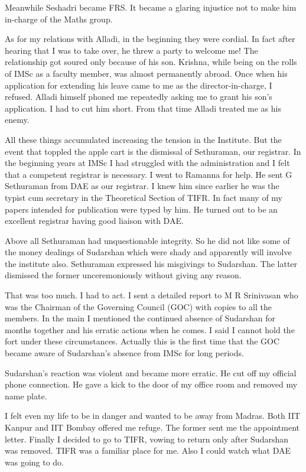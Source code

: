 Meanwhile Seshadri became FRS. It became a glaring injustice not to make 
him in-charge of the Maths group.

As for my relations with Alladi, in the beginning they were cordial. 
In fact after hearing that I was to take over, he threw a party to 
welcome me! The relationship got soured only because of his son. 
Krishna, while being on the rolls of IMSc as a faculty member, was 
almost permanently abroad. Once when his application for extending his 
leave came to me as the director-in-charge, I refused. Alladi himself 
phoned me repeatedly asking me to grant his son's application. I had to 
cut him short. From that time Alladi treated me as his enemy.
 
All these things accumulated increasing the tension in the Institute. 
But the event that toppled the apple cart is the dismissal of 
Sethuraman, our registrar. In the beginning years at IMSc I had 
struggled with the administration and I felt that a competent registrar 
is necessary. I went to Ramanna for help. He sent G Sethuraman from DAE 
as our registrar. I knew him since earlier he was the typist cum 
secretary in the Theoretical Section of TIFR. In fact many of my papers 
intended for publication were typed by him. He turned out to be an 
excellent registrar having good liaison with DAE.

Above all Sethuraman had unquestionable integrity. So he did not like 
some of the money dealings of Sudarshan which were shady and apparently 
will involve the institute also. Sethuraman expressed his misgivings to 
Sudarshan. The latter dismissed the former unceremoniously without giving 
any reason.

That was too much. I had to act. I sent a detailed report to M R 
Srinivasan who was the Chairman of the Governing Council (GOC) with 
copies to all the members. In the main I mentioned the continued absence 
of Sudarshan for months together and his erratic actions when he comes. 
I said I cannot hold the fort under these circumstances. Actually this 
is the first time that the GOC became aware of Sudarshan's absence from 
IMSc for long periods.

Sudarshan's reaction was violent and became more erratic. He cut off my 
official phone connection. He gave a kick to the door of my office room 
and removed my name plate.

I felt even my life to be in danger and wanted to be away from Madras. 
Both IIT Kanpur and IIT Bombay offered me refuge. The former sent me the 
appointment letter. Finally I decided to go to TIFR, vowing to return 
only after Sudarshan was removed. TIFR was a familiar place for me. Also 
I could watch what DAE was going to do.

